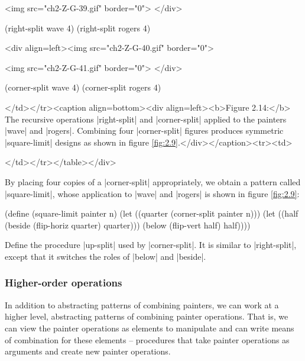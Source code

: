 \begin{Exercise}
\begin{Exercise}
\begin{Exercise}
<img src="ch2-Z-G-39.gif" border="0"> </div>

\begin{schemedisplay}
     (right-split wave 4)         (right-split rogers 4)
\end{schemedisplay}
<div align=left><img src="ch2-Z-G-40.gif" border="0">
          
<img src="ch2-Z-G-41.gif" border="0"> </div>

\begin{schemedisplay}
    (corner-split wave 4)         (corner-split rogers 4)
\end{schemedisplay}
</td></tr><caption align=bottom><div align=left><b>Figure 2.14:</b>  The recursive operations \scheme|right-split| and \scheme|corner-split| applied to the painters \scheme|wave| and \scheme|rogers|.
Combining four \scheme|corner-split| figures produces
symmetric \scheme|square-limit| designs as shown
in figure \ref{fig:2.9}.</div></caption><tr><td>

</td></tr></table></div> 

By placing four copies of a \scheme|corner-split|
appropriately, we obtain a pattern called \scheme|square-limit|, whose
application to \scheme|wave| and \scheme|rogers| is shown in
figure \ref{fig:2.9}:
\begin{schemedisplay}
(define (square-limit painter n)
  (let ((quarter (corner-split painter n)))
    (let ((half (beside (flip-horiz quarter) quarter)))
      (below (flip-vert half) half))))
\end{schemedisplay}

\begin{Exercise}
\label{exc:2.44}
Define the procedure \scheme|up-split| used by \scheme|corner-split|.
It is similar to \scheme|right-split|, except that it switches the
roles of \scheme|below| and \scheme|beside|.





\subsubsection*{Higher-order operations}


In addition to abstracting patterns of combining painters, we can work
at a higher level, abstracting patterns of combining painter operations.
That is, we can view the painter operations as elements to manipulate
and can write means of combination for these elements -- procedures that
take painter operations as arguments and create new painter operations.


\end{Exercise}
\end{Exercise}
\end{Exercise}
\end{Exercise}
